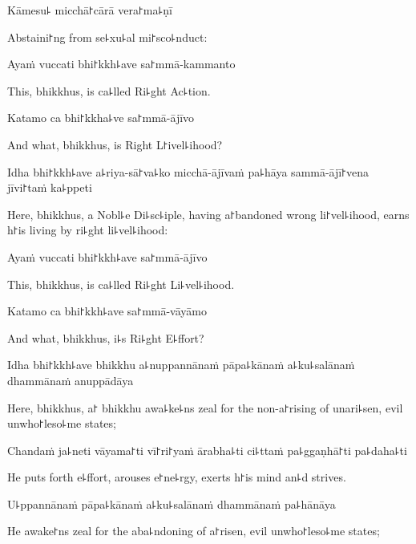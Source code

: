 Kāmesu꜕ micchā꜓cārā vera꜓ma꜕ṇī

\begin{english}
  Abstaini꜓ng from se꜕xu꜕al mi꜓sco꜕nduct:
\end{english}

Ayaṁ vuccati bhi꜓kkh꜕ave sa꜓mmā-kammanto

\begin{english}
  This, bhikkhus, is ca꜕lled Ri꜕ght Ac꜕tion.
\end{english}

Katamo ca bhi꜓kkha꜕ve sa꜓mmā-ājīvo

\begin{english}
  And what, bhikkhus, is Right L꜓ivel꜕ihood?
\end{english}

Idha bhi꜓kkh꜕ave a꜕riya-sā꜓va꜕ko micchā-ājīvaṁ pa꜕hāya sammā-ājī꜓vena jīvi꜓taṁ ka꜕ppeti

\begin{english}
  Here, bhikkhus, a Nobl꜕e Di꜕sc꜕iple, having a꜓bandoned wrong li꜓vel꜕ihood, earns h꜓is living by ri꜕ght li꜕vel꜕ihood:
\end{english}

Ayaṁ vuccati bhi꜓kkh꜕ave sa꜓mmā-ājīvo

\begin{english}
  This, bhikkhus, is ca꜕lled Ri꜕ght Li꜕vel꜕ihood.
\end{english}

Katamo ca bhi꜓kkh꜕ave sa꜓mmā-vāyāmo

\begin{english}
  And what, bhikkhus, i꜕s Ri꜕ght E꜕ffort?
\end{english}

Idha bhi꜓kkh꜕ave bhikkhu a꜕nuppannānaṁ pāpa꜕kānaṁ a꜕ku꜕salānaṁ dhammānaṁ anuppādāya

\begin{english}
  Here, bhikkhus, a꜓ bhikkhu awa꜕ke꜕ns zeal for the non-a꜓rising of unari꜕sen, evil unwho꜓leso꜕me states;
\end{english}

Chandaṁ ja꜕neti vāyama꜓ti vī꜓ri꜓yaṁ ārabha꜕ti ci꜕ttaṁ pa꜕ggaṇhā꜓ti pa꜕daha꜕ti

\begin{english}
  He puts forth e꜕ffort, arouses e꜓ne꜕rgy, exerts h꜓is mind an꜕d strives.
\end{english}

U꜕ppannānaṁ pāpa꜕kānaṁ a꜕ku꜕salānaṁ dhammānaṁ pa꜕hānāya

\begin{english}
  He awake꜓ns zeal for the aba꜕ndoning of a꜓risen, evil unwho꜓leso꜕me states;
\end{english}

